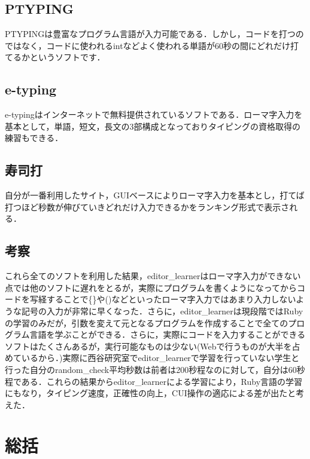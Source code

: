 \documentclass[11pt,dvipdfmx]{jsarticle}
\begin{document}
\subsection{PTYPING}\label{ptyping}

PTYPINGは豊富なプログラム言語が入力可能である．しかし，コードを打つのではなく，コードに使われるintなどよく使われる単語が60秒の間にどれだけ打てるかというソフトです．

\subsection{e-typing}\label{e-typing}

e-typingはインターネットで無料提供されているソフトである．ローマ字入力を基本として，単語，短文，長文の3部構成となっておりタイピングの資格取得の練習もできる．

\subsection{寿司打}\label{ux5bffux53f8ux6253}

自分が一番利用したサイト，GUIベースによりローマ字入力を基本とし，打てば打つほど秒数が伸びていきどれだけ入力できるかをランキング形式で表示される．

\subsection{考察}\label{ux8003ux5bdf}

これら全てのソフトを利用した結果，editor\_learnerはローマ字入力ができない点では他のソフトに遅れをとるが，実際にプログラムを書くようになってからコードを写経することで\{\}や()などといったローマ字入力ではあまり入力しないような記号の入力が非常に早くなった．さらに，editor\_learnerは現段階ではRubyの学習のみだが，引数を変えて元となるプログラムを作成することで全てのプログラム言語を学ぶことができる．さらに，実際にコードを入力することができるソフトはたくさんあるが，実行可能なものは少ない(Webで行うものが大半を占めているから．)実際に西谷研究室でeditor\_learnerで学習を行っていない学生と行った自分のrandom\_check平均秒数は前者は200秒程なのに対して，自分は60秒程である．これらの結果からeditor\_learnerによる学習により，Ruby言語の学習にもなり，タイピング速度，正確性の向上，CUI操作の適応による差が出たと考えた．

    \section{総括}\label{ux7dcfux62ec}
\end{document}
